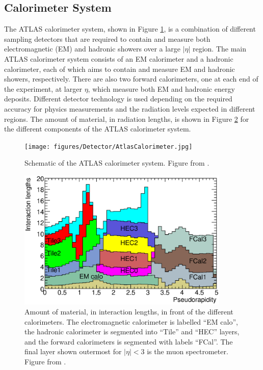 \subsection{Calorimeter System}
\label{sec:Det:Calo}

The ATLAS calorimeter system, shown in Figure \ref{Det:ATLASCalo}, is a combination of different sampling detectors that are required to contain and measure both electromagnetic (EM) and hadronic showers over a large $|\eta|$ region. 
The main ATLAS calorimeter system consists of an EM calorimeter and a hadronic calorimeter, each of which aims to contain and measure EM and hadronic showers, respectively. 
There are also two forward calorimeters, one at each end of the experiment, at larger $\eta{}$, which measure both EM and hadronic energy deposits.
Different detector technology is used depending on the required accuracy for physics measurements and the radiation levels expected in different regions.
The amount of material, in radiation lengths, is shown in Figure \ref{Det:RadLegnth} for the different components of the ATLAS calorimeter system. 


\begin{figure}
  \centering
  \texttt{[image: figures/Detector/AtlasCalorimeter.jpg]}
\caption[The ATLAS Calorimeter System]{
Schematic of the ATLAS calorimeter system.
Figure from \cite{ref:ATLASExp}.
\label{Det:ATLASCalo}
}
\end{figure}

\begin{figure}
  \centering
  \includegraphics[width=0.9\textwidth]{figures/Detector/CalorimeterRadLegnths.eps}
  \caption[Radiation Lengths of the Calorimeter Sub-detectors ]{
Amount of material, in interaction lengths, in front of the different calorimeters.
The electromagnetic calorimeter is labelled ``EM calo'', the hadronic calorimeter is segmented into ``Tile'' and ``HEC'' layers, and the forward calorimeters is segmented with labels ``FCal''.
The final layer shown outermost for $|\eta|<3$ is the muon spectrometer.
Figure from \cite{ref:ATLASExp}.
\label{Det:RadLegnth}
}
\end{figure}





